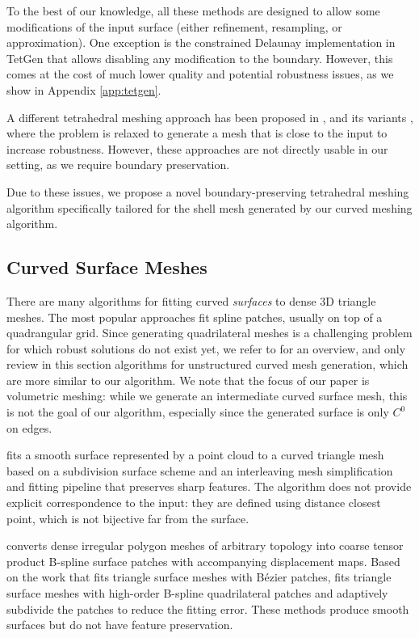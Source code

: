 To the best of our knowledge, all these methods are designed to allow some modifications of the input surface (either refinement, resampling, or approximation). One exception is the constrained Delaunay implementation in TetGen \cite{tetgen} that allows disabling any modification to the boundary. However, this comes at the cost of much lower quality and potential robustness issues, as we show in Appendix \ref{app:tetgen}. 

A different tetrahedral meshing approach has been proposed in \cite{hu2018tetrahedral}, and its variants \cite{Hu:2020:fTetWild,hu2019triwild}, where the problem is relaxed to generate a mesh that is close to the input to increase robustness. However, these approaches are not directly usable in our setting, as we require boundary preservation.

Due to these issues, we propose a novel boundary-preserving tetrahedral meshing algorithm specifically tailored for the shell mesh generated by our curved meshing algorithm.

\subsection{Curved Surface Meshes}
There are many algorithms for fitting curved \emph{surfaces} to dense 3D triangle meshes. The most popular approaches fit spline patches, usually on top of a quadrangular grid. Since generating quadrilateral meshes is a challenging problem for which robust solutions do not exist yet, we refer to \cite{QUADSTAR2012} for an overview, and only review in this section algorithms for unstructured curve{d} mesh generation, which are more similar to our algorithm. We note that the focus of our paper is volumetric meshing: while we generate an intermediate curved surface mesh, this is not the goal of our algorithm, especially since the generated surface is only $C^0$ on edges.

\cite{hoppe1994piecewise} fits a smooth surface represented by a point cloud to a curved triangle mesh based on a subdivision surface scheme and an interleaving mesh simplification and fitting pipeline that preserves sharp features. 
The algorithm does not provide explicit correspondence to the input: they are defined using distance closest point, which is not bijective far from the surface. 

\cite{krishnamurthy1996fitting} converts dense irregular polygon meshes of arbitrary topology into coarse tensor product B-spline surface patches with accompanying displacement maps. Based on the work \cite{LIN2007adap} that fits triangle surface meshes with B\'ezier patches, \cite{Zhang2011multi} fits triangle surface meshes with high-order B-spline quadrilateral patches and adaptively subdivide the patches to reduce the fitting error. These methods produce smooth surfaces but do not have feature preservation.

